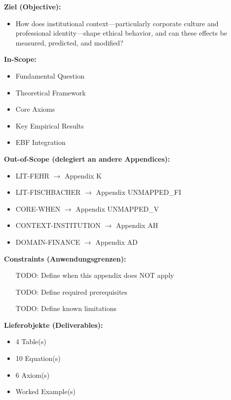 \begin{tcolorbox}[
    colback=orange!5!white,
    colframe=orange!75!black,
    title={\textbf{Appendix Scope: Ziel / In-Scope / Out-of-Scope / Constraints}},
    fonttitle=\bfseries
]

\textbf{Ziel (Objective):}
\begin{itemize}[nosep]
    \item How does institutional context---particularly corporate culture and professional identity---shape ethical behavior, and can these effects be measured, predicted, and modified?
\end{itemize}

\textbf{In-Scope:}
\begin{itemize}[nosep]
    \item Fundamental Question
    \item Theoretical Framework
    \item Core Axioms
    \item Key Empirical Results
    \item EBF Integration
\end{itemize}

\textbf{Out-of-Scope (delegiert an andere Appendices):}
\begin{itemize}[nosep]
    \item LIT-FEHR $\rightarrow$ Appendix K
    \item LIT-FISCHBACHER $\rightarrow$ Appendix UNMAPPED_FI
    \item CORE-WHEN $\rightarrow$ Appendix UNMAPPED_V
    \item CONTEXT-INSTITUTION $\rightarrow$ Appendix AH
    \item DOMAIN-FINANCE $\rightarrow$ Appendix AD
\end{itemize}

\textbf{Constraints (Anwendungsgrenzen):}
\begin{itemize}[nosep]
    \item [TODO: Define when this appendix does NOT apply]
    \item [TODO: Define required prerequisites]
    \item [TODO: Define known limitations]
\end{itemize}

\textbf{Lieferobjekte (Deliverables):}
\begin{itemize}[nosep]
    \item 4 Table(s)
    \item 10 Equation(s)
    \item 6 Axiom(s)
    \item Worked Example(s)
\end{itemize}

\end{tcolorbox}


